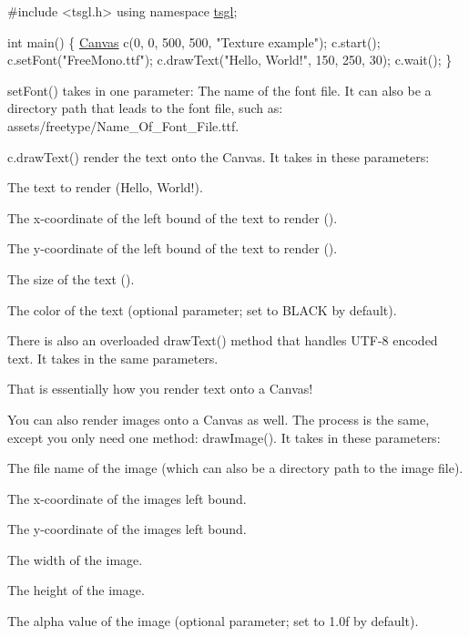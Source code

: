 \begin{DoxyCode}
\textcolor{preprocessor}{#include <tsgl.h>}
\textcolor{keyword}{using namespace }\hyperlink{namespacetsgl}{tsgl};

\textcolor{keywordtype}{int} main() \{
  \hyperlink{classtsgl_1_1_canvas}{Canvas} c(0, 0, 500, 500, \textcolor{stringliteral}{"Texture example"});
  c.start();
  c.setFont(\textcolor{stringliteral}{"FreeMono.ttf"});
  c.drawText(\textcolor{stringliteral}{"Hello, World!"}, 150, 250, 30);
  c.wait();
\}
\end{DoxyCode}


set\+Font() takes in one parameter\+: The name of the font file. It can also be a directory path that leads to the font file, such as\+: assets/freetype/\+Name\+\_\+\+Of\+\_\+\+Font\+\_\+\+File.\+ttf.

c.\+draw\+Text() render the text onto the Canvas. It takes in these parameters\+:


\begin{DoxyItemize}
\item The text to render ({\ttfamily Hello, World!}).
\item The x-\/coordinate of the left bound of the text to render ({}).
\item The y-\/coordinate of the left bound of the text to render ({}).
\item The size of the text ({}).
\item The color of the text (optional parameter; set to B\+L\+A\+C\+K by default).
\end{DoxyItemize}

There is also an overloaded draw\+Text() method that handles U\+T\+F-\/8 encoded text. It takes in the same parameters.

That is essentially how you render text onto a Canvas!

You can also render images onto a Canvas as well. The process is the same, except you only need one method\+: draw\+Image(). It takes in these parameters\+:


\begin{DoxyItemize}
\item The file name of the image (which can also be a directory path to the image file).
\item The x-\/coordinate of the image\textquotesingle{}s left bound.
\item The y-\/coordinate of the image\textquotesingle{}s left bound.
\item The width of the image.
\item The height of the image.
\item The alpha value of the image (optional parameter; set to 1.\+0f by default).
\end{DoxyItemize}

